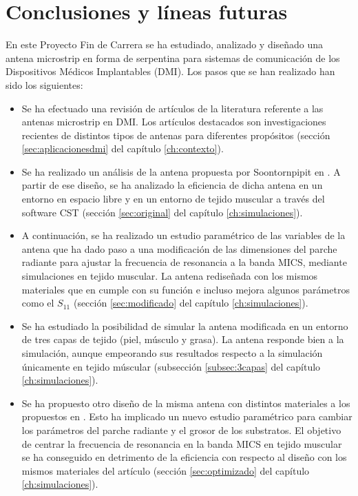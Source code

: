 \chapter{\textbf{Conclusiones y líneas futuras}}\label{conclusiones}

En este Proyecto Fin de Carrera se ha estudiado, analizado y diseñado una antena microstrip en forma de serpentina para sistemas de comunicación de los Dispositivos Médicos Implantables (DMI). Los pasos que se han realizado han sido los siguientes:

\begin{itemize}
    \item Se ha efectuado una revisión de artículos de la literatura referente a las antenas microstrip en DMI. Los artículos destacados son investigaciones recientes de distintos tipos de antenas para diferentes propósitos (sección \ref{sec:aplicacionesdmi} del capítulo \ref{ch:contexto}).
    \item Se ha realizado un análisis de la antena propuesta por Soontornpipit en \cite{soont}. A partir de ese diseño, se ha analizado la eficiencia de dicha antena en un entorno en espacio libre y en un entorno de tejido muscular a través del software CST (sección \ref{sec:original} del capítulo \ref{ch:simulaciones}).
    \item A continuación, se ha realizado un estudio paramétrico de las variables de la antena que ha dado paso a una modificación de las dimensiones del parche radiante para ajustar la frecuencia de resonancia a la banda MICS, mediante simulaciones en tejido muscular. La antena rediseñada con los mismos materiales que en \cite{soont} cumple con su función e incluso mejora algunos parámetros como el $S_{11}$ (sección \ref{sec:modificado} del capítulo \ref{ch:simulaciones}).
    \item Se ha estudiado la posibilidad de simular la antena modificada en un entorno de tres capas de tejido (piel, músculo y grasa). La antena responde bien a la simulación, aunque empeorando sus resultados respecto a la simulación únicamente en tejido múscular (subsección \ref{subsec:3capas} del capítulo \ref{ch:simulaciones}).
    \item Se ha propuesto otro diseño de la misma antena con distintos materiales a los propuestos en \cite{soont}. Esto ha implicado un nuevo estudio paramétrico para cambiar los parámetros del parche radiante y el grosor de los substratos. El objetivo de centrar la frecuencia de resonancia en la banda MICS en tejido muscular se ha conseguido en detrimento de la eficiencia con respecto al diseño con los mismos materiales del artículo (sección \ref{sec:optimizado} del capítulo \ref{ch:simulaciones}).
\end{itemize}


